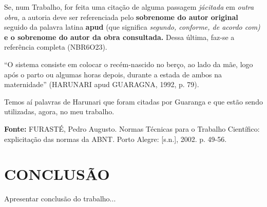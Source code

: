 \documentclass[rel_mlp]{iiufrgs}
\begin{document}
Se, num Trabalho, for feita uma citação de alguma passagem {\it já}{\bf {\it  }}{\it citada} em {\it outra obra, }a autoria deve ser referenciada pelo {\bf sobrenome do autor original }seguido da palavra latina {\bf apud }(que significa {\it segundo, conforme, de acordo com) }{\bf e o sobrenome do autor da obra consultada. }Dessa última, faz-se a referência completa (NBR6O23).

``O sistema consiste em colocar o recém-nascido no berço, ao lado da mãe, logo após o parto ou algumas horas depois, durante a estada de ambos na maternidade'' (HARUNARI apud GUARAGNA, 1992, p. 79).

Temos aí palavras de Harunari que foram citadas por Guaranga e que estão sendo utilizadas, agora, no meu trabalho.

{\bf Fonte:} FURASTÉ, Pedro Augusto. Normas Técnicas para o Trabalho Científico: explicitação das normas da ABNT. Porto Alegre: [s.n.], 2002. p. 49-56.

\noindent 


%
\chapter{CONCLUSÃO}

Apresentar conclusão do trabalho...




%

%







\\

\\

\\
\end{document}
